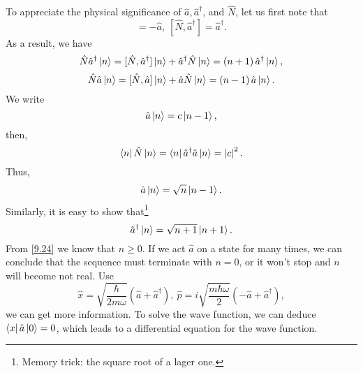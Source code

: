 \documentclass{article}
\theoremstyle{1}
\begin{document}
To appreciate the physical significance of $\hat{a},\hat{a}^\dagger$, and $\hat{N}$, let us first note that 
\begin{equation}
    [\hat{N},\hat{a}]=-\hat{a},\ [\hat{N},\hat{a}^\dagger]=\hat{a}^\dagger.
\end{equation}
As a result, we have
\begin{equation}
    \hat{N}\hat{a}^\dagger\ket{n}=[\hat{N},\hat{a}^\dagger]\ket{n}+\hat{a}^\dagger\hat{N}\ket{n}=\left(n+1\right)\hat{a}^\dagger\ket{n},
\end{equation}
\begin{equation}
    \hat{N}\hat{a}\ket{n}=[\hat{N},\hat{a}]\ket{n}+\hat{a}\hat{N}\ket{n}=\left(n-1\right)\hat{a}\ket{n}.
\end{equation}
We write
\begin{equation}
    \hat{a}\ket{n}=c\ket{n-1},
\end{equation}
then, 
\begin{equation}\label{9.24}
    \bra{n}\hat{N}\ket{n}=\bra{n}\hat{a}^\dagger\hat{a}\ket{n}=\left|c\right|^2.
\end{equation}
Thus, 
\begin{equation}
    \hat{a}\ket{n}=\sqrt{n}\ket{n-1}.
\end{equation}
Similarly, it is easy to show that\footnote{Memory trick: the square root of a lager one.}
\begin{equation}
    \hat{a}^\dagger\ket{n}=\sqrt{n+1}\ket{n+1}.
\end{equation}
From \eqref{9.24} we know that $n\ge0.$
If we act $\hat{a}$ on a state for many times, we can conclude that the sequence must
terminate with $n=0$, or it won't stop and $n$ will become not real.
Use 
\begin{equation}
    \hat{x}=\sqrt{\frac{\hbar}{2m\omega}}\left(\hat{a}+\hat{a}^\dagger\right),\ \hat{p}=i\sqrt{\frac{m\hbar\omega}{2}}\left(-\hat{a}+\hat{a}^\dagger\right),
\end{equation}
we can get more information. To solve the wave function, we can deduce $\bra{x}\hat{a}\ket{0}=0$, which leads to a differential equation for the wave function.
\end{document}
